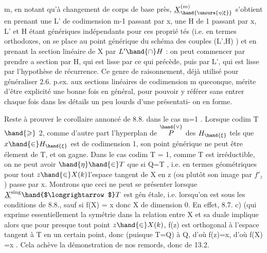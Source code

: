 
\margin{|}m, en notant qu'à changement de corps de base près, $\underline{X}^{(m)}_{\hand{\unsure{\eta|\xi}}}$ s'obtient en
prenant une L' de codimension m-1 passant par x, une H de 
1 passant par x, L' et H étant génériques indépendants pour ces proprié
tés (i.e. en termes orthodoxes, on se place au point générique du 
schéma des couples (L',H)  ) et en prenant la section linéaire
de X par $L'\hand{\cap} H$ : on peut commencer par prendre a section par H, qui
est lisse par ce qui précède, puis par L', qui est lisse par l'hypothèse
de récurrence. Ce genre de raisonnement, déjà utilisé pour généraliser
2.6. p.ex. aux sections linéaires de codimension m queconque, mérite
d'être explicité une bonne fois en général, pour pouvoir y référer sans
entrer  chaque fois dans les détails un peu lourds d'une présentati-%
on en forme.

Reste à prouver le corollaire annoncé de 8.8. dans le cas m=1 .
Lorsque  codim T $\hand{\geqslant}$ 2, comme d'autre part l'hyperplan  de $\overset{\hand{\vee}}{P}$ des
$H_{\hand{\xi}}$ tels que $x\hand{\in} H_{\hand{\xi}}$ est de codimension 1, son point générique \inserted{$\eta$} ne peut
être élement de T, et on gagne. Dans le cas codim T = 1, comme T est
irréductible, on ne peut avoir $\hand{\eta}\hand{\in} T$ que si Q=T ,
i.e. en termes géométriques   pour tout $z\hand{\in} X(k)$l'espace tangent
de X en z (ou plutôt son image par $f'_{z}$ ) passe par x. Montrons que
ceci ne peut se présenter lorsque $\underline{X}^{\mathrm{sing}}\hand{$\longrightarrow$}T$ est gén étale, i.e.
lorsqu'on est sous les conditions de 8.8., sauf si f(X) = \hand{\{}x\hand{\}} donc X
de dimension 0. En effet, 8.7. c) (qui exprime essentiellement la
symétrie  dans la relation entre X et sa duale \hand{)} implique alors que
pour presque tout point $z\hand{\in} X(k)$, f(z) est orthogonal à l'espace tangent
à T en un certain point, donc (puisque T=Q)  à Q, d'où f(z)=x, d'où
f(X) =\hand{\{}x\hand{\}} . Cela achève la démonstration de nos remords, donc de 13.2.

